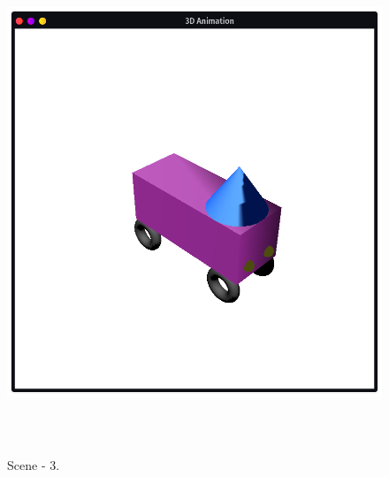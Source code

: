 \documentclass[12pt, a4]{article}
\begin{document}
\subsection*{}
\begin{figure}[h]
\centering
\caption{Scene - 3.}
\includegraphics[height=15cm, width=15cm]{Outputs/Animation-2.png}
\end{figure}


\newpage
\end{document}
